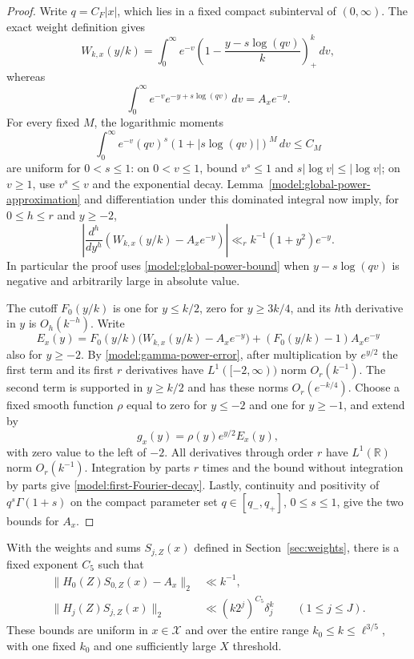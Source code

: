 \begin{proof}
Write $q=C_F|x|$, which lies in a fixed compact subinterval of
$(0,\infty)$.  The exact weight definition gives
\[
 W_{k,x}(y/k)=\int_0^\infty e^{-v}
 \left(1-\frac{y-s\log(qv)}k\right)_+^k\,dv,
\]
whereas
\[
 \int_0^\infty e^{-v}e^{-y+s\log(qv)}\,dv=A_xe^{-y}.
\]
For every fixed $M$, the logarithmic moments
\begin{equation}
 \int_0^\infty e^{-v}(qv)^s
           (1+|s\log(qv)|)^M\,dv\le C_M
 \label{model:gamma-log-moments}
\end{equation}
are uniform for $0<s\le1$: on $0<v\le1$, bound $v^s\le1$ and
$s|\log v|\le|\log v|$; on $v\ge1$, use $v^s\le v$ and the
exponential decay.  Lemma~\ref{model:global-power-approximation} and
differentiation under this dominated integral now imply, for
$0\le h\le r$ and $y\ge-2$,
\begin{equation}
 \left|\frac{d^h}{dy^h}
       \left(W_{k,x}(y/k)-A_xe^{-y}\right)\right|
 \ll_r k^{-1}(1+y^2)e^{-y}.
 \label{model:gamma-power-error}
\end{equation}
In particular the proof uses \eqref{model:global-power-bound} when
$y-s\log(qv)$ is negative and arbitrarily large in absolute value.

The cutoff $F_0(y/k)$ is one for $y\le k/2$, zero for
$y\ge3k/4$, and its $h$th derivative in $y$ is $O_h(k^{-h})$.
Write
\[
 E_x(y)=F_0(y/k)\big(W_{k,x}(y/k)-A_xe^{-y}\big)
                    +(F_0(y/k)-1)A_xe^{-y}
\]
also for $y\ge-2$.  By \eqref{model:gamma-power-error}, after
multiplication by $e^{y/2}$ the first term and its first $r$ derivatives
have $L^1([-2,\infty))$ norm $O_r(k^{-1})$.  The second term is
supported in $y\ge k/2$ and has these norms $O_r(e^{-k/4})$.
Choose a fixed smooth function $\rho$ equal to zero for $y\le-2$ and
one for $y\ge-1$, and extend by
\[
 g_x(y)=\rho(y)e^{y/2}E_x(y),
\]
with zero value to the left of $-2$.  All derivatives through order
$r$ have $L^1(\mathbb R)$ norm $O_r(k^{-1})$.  Integration by parts
$r$ times and the bound without integration by parts give
\eqref{model:first-Fourier-decay}.  Lastly, continuity and positivity
of $q^s\Gamma(1+s)$ on the compact parameter set $q\in[q_-,q_+]$,
$0\le s\le1$, give the two bounds for $A_x$.
\end{proof}

\begin{proposition}
\label{model:main-model-estimates}
With the weights and sums $S_{j,Z}(x)$ defined in
Section~\ref{sec:weights}, there is a fixed exponent $C_5$ such
that
\begin{align}
 \|H_0(Z)S_{0,Z}(x)-A_x\|_2&\ll k^{-1},
 \label{model:first-piece-norm}\\
 \|H_j(Z)S_{j,Z}(x)\|_2&\ll(k2^j)^{C_5}\delta_j^k
                    \qquad(1\le j\le J).
 \label{model:later-piece-norm}
\end{align}
These bounds are uniform in $x\in\mathcal X$ and over the entire
range $k_0\le k\le\ell^{3/5}$, with one fixed $k_0$ and one
sufficiently large $X$ threshold.
\end{proposition}

